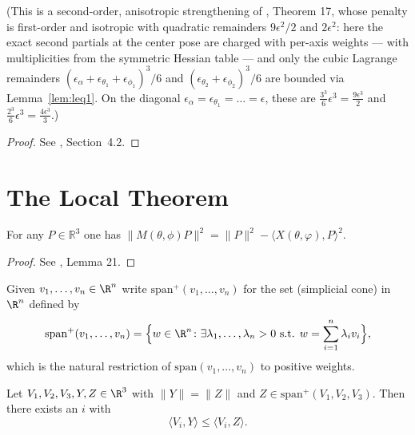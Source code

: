 \begin{theorem}
    (This is a second-order, anisotropic strengthening of
    \cite{polyhedron.without.rupert}, Theorem 17, whose penalty is first-order
    and isotropic with quadratic remainders $9\epsilon^2/2$ and $2\epsilon^2$:
    here the exact second partials at the center pose are charged with
    per-axis weights — with multiplicities from the symmetric Hessian table —
    and only the cubic Lagrange remainders
    $(\epsilon_\alpha+\epsilon_{\theta_1}+\epsilon_{\phi_1})^3/6$ and
    $(\epsilon_{\theta_2}+\epsilon_{\phi_2})^3/6$ are bounded via
    Lemma~\ref{lem:leq1}. On the diagonal
    $\epsilon_\alpha = \epsilon_{\theta_1} = \dots = \epsilon$, these are
    $\frac{3^3}{6}\epsilon^3 = \frac{9\epsilon^3}{2}$ and
    $\frac{2^3}{6}\epsilon^3 = \frac{4\epsilon^3}{3}$.)
\end{theorem}

\begin{proof}
\leanok
{}
See \cite{polyhedron.without.rupert}, Section~{4.2}.
\end{proof}


\chapter{The Local Theorem}

\begin{lemma} \label{lem:pythagoras}
  \leanok
    For any $P \in \mathbb{R}^3$ one has
    $\big\|M(\theta, \phi) P\big\|^2=\|P\|^2-\langle X({\theta,\varphi}),P\rangle^2$.
\end{lemma}

\begin{proof}
\leanok
See \cite{polyhedron.without.rupert}, Lemma 21.
\end{proof}

\begin{definition} \label{def:spanp}
  \leanok
      Given $v_1, \dots, v_n \in \R^n$ write $\mathrm{span}^+(v_1,\dots,v_n)$ for the set (simplicial cone) in $\R^n$ defined by
    \[
        \mathrm{span}^+(v_1,\dots,v_n) = \Big\{ w \in \R^n \colon \exists \lambda_1,\dots,\lambda_n > 0 \text{ s.t. } w = \sum_{i=1}^n \lambda_i v_i \Big\},
    \]
    which is the natural restriction of $\mathrm{span}(v_1,\dots,v_n)$ to positive weights.
\end{definition}

\begin{lemma} \label{lem:langles}
  \leanok
Let $V_1,V_2,V_3,Y,Z \in \R^3$ with $\|Y \|=\| Z \|$ and $Z \in \mathrm{span}^+(V_1,V_2,V_3)$. Then there exists an $i$ with
\[
    \langle V_i, Y \rangle \leq \langle V_i, Z \rangle.
\]
\end{lemma}

